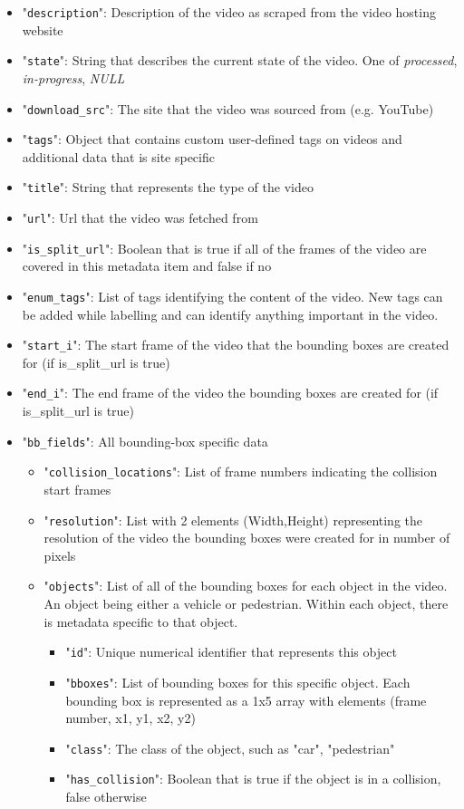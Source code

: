 \documentclass[letterpaper, 10 pt, conference]{IEEEconf}
\begin{document}
\begin{itemize}
  \item "\texttt{description}": Description of the video as scraped from the video hosting website
  \item "\texttt{state}": String that describes the current state of the video. One of \textit{processed}, \textit{in-progress}, \textit{NULL}
  \item "\texttt{download\_src}": The site that the video was sourced from (e.g. YouTube)
  \item "\texttt{tags}": Object that contains custom user-defined tags on videos and additional data that is site specific
  \item "\texttt{title}": String that represents the type of the video
  \item "\texttt{url}": Url that the video was fetched from
  \item "\texttt{is\_split\_url}": Boolean that is true if all of the frames of the video are covered in this metadata item and false if no
  \item "\texttt{enum\_tags}": List of tags identifying the content of the video. New tags can be added while labelling and can identify anything important in the video.
  \item "\texttt{start\_i}": The start frame of the video that the bounding boxes are created for (if is\_split\_url is true)
  \item "\texttt{end\_i}": The end frame of the video the bounding boxes are created for (if is\_split\_url is true)
  \item "\texttt{bb\_fields}": All bounding-box specific data
  \begin{itemize}
    \item "\texttt{collision\_locations}": List of frame numbers indicating the collision start frames
    \item "\texttt{resolution}": List with 2 elements (Width,Height) representing the resolution of the video the bounding boxes were created for in number of pixels 
    \item "\texttt{objects}": List of all of the bounding boxes for each object in the video. An object being either a vehicle or pedestrian. Within each object, there is metadata specific to that object.
    \begin{itemize}
      \item "\texttt{id}": Unique numerical identifier that represents this object
      \item "\texttt{bboxes}": List of bounding boxes for this specific object. Each bounding box is represented as a 1x5 array with elements (frame number, x1, y1, x2, y2)
      \item "\texttt{class}": The class of the object, such as "car", "pedestrian"
      \item "\texttt{has\_collision}": Boolean that is true if the object is in a collision, false otherwise
    \end{itemize}
  \end{itemize}
\end{itemize}
\end{document}
